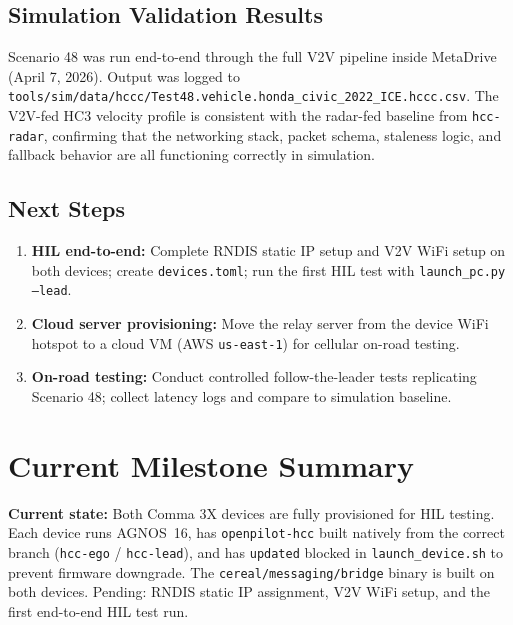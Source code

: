 \documentclass[12pt]{article}
\begin{document}
\subsection{Simulation Validation Results}

Scenario 48 was run end-to-end through the full V2V pipeline inside MetaDrive (April 7, 2026). Output was logged to \texttt{tools/sim/data/hccc/Test48.vehicle.honda\_civic\_2022\_ICE.hccc.csv}. The V2V-fed HC3 velocity profile is consistent with the radar-fed baseline from \texttt{hcc-radar}, confirming that the networking stack, packet schema, staleness logic, and fallback behavior are all functioning correctly in simulation.

\subsection{Next Steps}

\begin{enumerate}
  \item \textbf{HIL end-to-end:} Complete RNDIS static IP setup and V2V WiFi setup on both devices; create \texttt{devices.toml}; run the first HIL test with \texttt{launch\_pc.py --lead}.
  \item \textbf{Cloud server provisioning:} Move the relay server from the device WiFi hotspot to a cloud VM (AWS \texttt{us-east-1}) for cellular on-road testing.
  \item \textbf{On-road testing:} Conduct controlled follow-the-leader tests replicating Scenario 48; collect latency logs and compare to simulation baseline.
\end{enumerate}


\section{Current Milestone Summary}

\begin{notebox}
\textbf{Current state:} Both Comma 3X devices are fully provisioned for HIL testing. Each device runs AGNOS~16, has \texttt{openpilot-hcc} built natively from the correct branch (\texttt{hcc-ego} / \texttt{hcc-lead}), and has \texttt{updated} blocked in \texttt{launch\_device.sh} to prevent firmware downgrade. The \texttt{cereal/messaging/bridge} binary is built on both devices. Pending: RNDIS static IP assignment, V2V WiFi setup, and the first end-to-end HIL test run.
\end{notebox}
\end{document}
